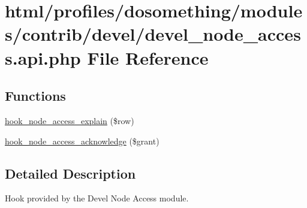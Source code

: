 \hypertarget{devel__node__access_8api_8php}{
\section{html/profiles/dosomething/modules/contrib/devel/devel\_\-node\_\-access.api.php File Reference}
\label{devel__node__access_8api_8php}
}
\subsection*{Functions}
\begin{DoxyCompactItemize}
\item 
\hyperlink{group__hooks_gaeedf3adea0813fb3631f26d0de83a68d}{hook\_\-node\_\-access\_\-explain} (\$row)
\item 
\hyperlink{group__hooks_gac5a197ac3564b867c2921fb496063ae6}{hook\_\-node\_\-access\_\-acknowledge} (\$grant)
\end{DoxyCompactItemize}


\subsection{Detailed Description}
Hook provided by the Devel Node Access module. 